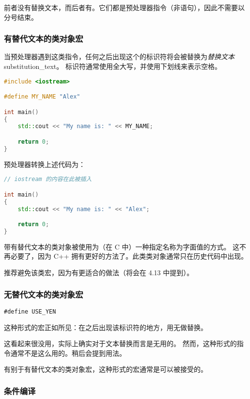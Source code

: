 \documentclass[../../LearnCpp.tex]{subfiles}
\begin{document}
前者没有替换文本，而后者有。它们都是预处理器指令（非语句），因此不需要以分号结束。

\subsubsection*{有替代文本的类对象宏}

当预处理器遇到这类指令，任何之后出现这个的标识符将会被替换为\textit{替换文本} substitution\_text。
标识符通常使用全大写，并使用下划线来表示空格。

\begin{lstlisting}[language=C++]
#include <iostream>

#define MY_NAME "Alex"

int main()
{
    std::cout << "My name is: " << MY_NAME;

    return 0;
}
\end{lstlisting}

预处理器转换上述代码为：

\begin{lstlisting}[language=C++]
// iostream 的内容在此被插入

int main()
{
    std::cout << "My name is: " << "Alex";

    return 0;
}
\end{lstlisting}

带有替代文本的类对象被使用为（在 C 中）一种指定名称为字面值的方式。
这不再必要了，因为 C++ 拥有更好的方法了。此类类对象通常只在历史代码中出现。

推荐避免该类宏，因为有更适合的做法（将会在 4.13 中提到）。

\subsubsection*{无替代文本的类对象宏}

\begin{lstlisting}
#define USE_YEN
\end{lstlisting}

这种形式的宏正如所见：在之后出现该标识符的地方，用无做替换。

这看起来很没用，实际上确实对于文本替换而言是无用的。
然而，这种形式的指令通常不是这么用的。稍后会提到用法。

有别于有替代文本的类对象宏，这种形式的宏通常是可以被接受的。

\subsubsection*{条件编译}
\end{document}
